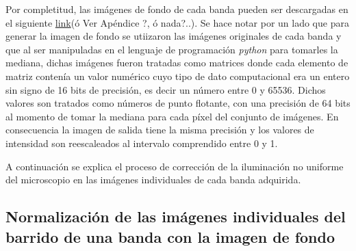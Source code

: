 Por completitud, las imágenes de fondo de cada banda pueden ser descargadas en el siguiente \href{https://google.com/open?id=1LfXvzmIMxf18PmQXzHdFhJl9xa6Ot2BS}{link}(ó Ver Apéndice ?, ó nada?..). Se hace notar por un lado que para generar la imagen de fondo se utiizaron las imágenes originales de cada banda y que al ser manipuladas en el lenguaje de programación \textit{python} para tomarles la mediana, dichas imágenes fueron tratadas como matrices donde cada elemento de matriz contenía un valor numérico cuyo tipo de dato computacional era un entero sin signo de 16 bits de precisión, es decir un número entre 0 y 65536. Dichos valores son tratados como números de punto flotante, con una precisión de 64 bits al momento de tomar la mediana para cada píxel del conjunto de imágenes. En consecuencia la imagen de salida tiene la misma precisión y los valores de intensidad son reescaleados al intervalo comprendido entre 0 y 1.

A continuación se explica el proceso de corrección de la iluminación no uniforme del microscopio en las imágenes individuales de cada banda adquirida.	
	
\singlespacing
\subsection{Normalización de las imágenes individuales del barrido de una banda con la imagen de fondo \href{https://github.com/jrr1984/defects_analysis/blob/master/MAIN/bg_normalization.py}{\faGithub}}

